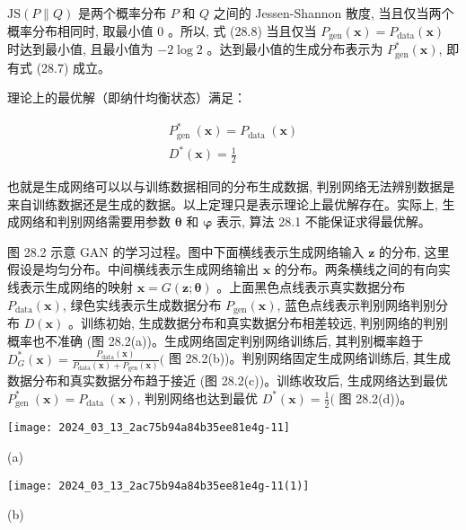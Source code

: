 \documentclass[10pt]{article}
\begin{document}
$\mathrm{JS}(P \| Q)$ 是两个概率分布 $P$ 和 $Q$ 之间的 Jessen-Shannon 散度, 当且仅当两个概率分布相同时, 取最小值 0 。所以, 式 (28.8) 当且仅当 $P_{\mathrm{gen}}(\boldsymbol{x})=P_{\mathrm{data}}(\boldsymbol{x})$ 时达到最小值, 且最小值为 $-2 \log 2$ 。达到最小值的生成分布表示为 $P_{\mathrm{gen}}^{*}(\boldsymbol{x})$, 即有式 (28.7) 成立。

理论上的最优解（即纳什均衡状态）满足：


\begin{gather*}
P_{\text {gen }}^{*}(\boldsymbol{x})=P_{\text {data }}(\boldsymbol{x})  \tag{28.9}\\
D^{*}(\boldsymbol{x})=\frac{1}{2} \tag{28.10}
\end{gather*}


也就是生成网络可以以与训练数据相同的分布生成数据, 判别网络无法辨别数据是来自训练数据还是生成的数据。以上定理只是表示理论上最优解存在。实际上, 生成网络和判别网络需要用参数 $\boldsymbol{\theta}$ 和 $\boldsymbol{\varphi}$ 表示, 算法 28.1 不能保证求得最优解。

图 28.2 示意 GAN 的学习过程。图中下面横线表示生成网络输入 $\boldsymbol{z}$ 的分布, 这里假设是均匀分布。中间横线表示生成网络输出 $\boldsymbol{x}$ 的分布。两条横线之间的有向实线表示生成网络的映射 $\boldsymbol{x}=G(\boldsymbol{z} ; \boldsymbol{\theta})$ 。上面黑色点线表示真实数据分布 $P_{\mathrm{data}}(\boldsymbol{x})$, 绿色实线表示生成数据分布 $P_{\mathrm{gen}}(\boldsymbol{x})$, 蓝色点线表示判别网络判别分布 $D(\boldsymbol{x})$ 。训练初始, 生成数据分布和真实数据分布相差较远, 判别网络的判别概率也不准确 (图 28.2(a))。生成网络固定判别网络训练后, 其判别概率趋于 $D_{G}^{*}(\boldsymbol{x})=\frac{P_{\mathrm{data}}(\boldsymbol{x})}{P_{\mathrm{data}}(\boldsymbol{x})+P_{\mathrm{gen}}(\boldsymbol{x})}($ 图 28.2(b))。判别网络固定生成网络训练后, 其生成数据分布和真实数据分布趋于接近 (图 28.2(c))。训练收玫后, 生成网络达到最优 $P_{\text {gen }}^{*}(\boldsymbol{x})=P_{\text {data }}(\boldsymbol{x})$, 判别网络也达到最优 $D^{*}(\boldsymbol{x})=\frac{1}{2}($ 图 28.2(d))。

\begin{center}
\texttt{[image: 2024\_03\_13\_2ac75b94a84b35ee81e4g-11]}
\end{center}

(a)

\begin{center}
\texttt{[image: 2024\_03\_13\_2ac75b94a84b35ee81e4g-11(1)]}
\end{center}

(b)
\end{document}
